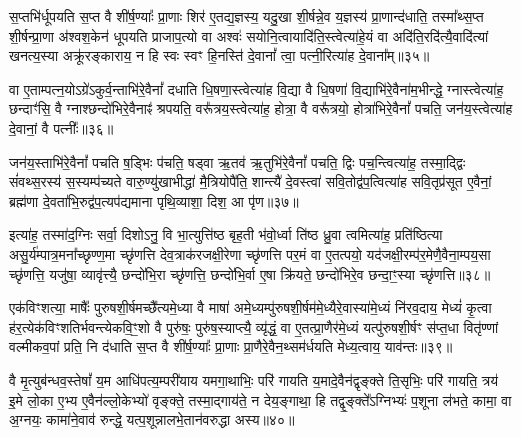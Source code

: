 {\anuvakamend[{तेनै॒व लोम॑भिः॒ समे॒ते अ॑भि॒चर॑त॒ एक॑विꣳशतिश्च॥६॥}]}

स॒प्तभि॑र्धूपयति स॒प्त वै शी॑र्\mbox{}ष॒ण्याः᳚ प्रा॒णाः शिर॑ ए॒तद्य॒ज्ञस्य॒ यदु॒खा शी॒र्\mbox{}षन्ने॒व य॒ज्ञस्य॑ प्रा॒णान्द॑धाति॒ तस्मा᳚थ्स॒प्त शी॒र्\mbox{}षन्प्रा॒णा अ॑श्वश॒केन॑ धूपयति प्राजाप॒त्यो वा अश्वः॑ सयोनि॒त्वायादि॑ति॒स्त्वेत्या॑हे॒यं वा अदि॑ति॒रदि॑त्यै॒वादि॑त्यां खनत्य॒स्या अक्रू॑रङ्काराय॒ न हि स्वः स्वꣳ हि॒नस्ति॑ दे॒वानां᳚ त्वा॒ पत्नी॒रित्या॑ह दे॒वाना᳚म्॥३५॥

वा ए॒ताम्पत्न॒यो\-ऽग्रे॑\-ऽकुर्व॒न्ताभि॑रे॒वैनां᳚ दधाति धि॒षणा॒स्त्वेत्या॑ह वि॒द्या वै धि॒षणा॑ वि॒द्याभि॑रे॒वैना॑म॒भीन्द्धे॒ ग्नास्त्वेत्या॑ह॒ छन्दाꣳ॑सि॒ वै ग्नाश्छन्दो॑भिरे॒वैनाꣴ॑ श्रपयति॒ वरू᳚त्रय॒स्त्वेत्या॑ह॒ होत्रा॒ वै वरू᳚त्रयो॒ होत्रा॑भिरे॒वैनां᳚ पचति॒ जन॑य॒स्त्वेत्या॑ह दे॒वानां॒ वै पत्नीः᳚॥३६॥

जन॑य॒स्ताभि॑रे॒वैनां᳚ पचति ष॒ड्भिः प॑चति॒ षड्वा ऋ॒तव॑ ऋ॒तुभि॑रे॒वैनां᳚ पचति॒ द्विः पच॒न्त्वित्या॑ह॒ तस्मा॒द्द्विः सं॑वथ्स॒रस्य॑ स॒स्यम्प॑च्यते वारु॒ण्यु॑खाभीद्धा॑ मै॒त्रियोपै॑ति॒ शान्त्यै॑ दे॒वस्त्वा॑ सवि॒तोद्व॑प॒त्वित्या॑ह सवि॒तृप्र॑सूत ए॒वैनां॒ ब्रह्म॑णा दे॒वता॑भि॒रुद्व॑प॒त्यप॑द्यमाना पृथि॒व्याशा॒ दिश॒ आ पृ॑ण॥३७॥

इत्या॑ह॒ तस्मा॑द॒ग्निः सर्वा॒ दिशो\-ऽनु॒ वि भा॒त्युत्ति॑ष्ठ बृह॒ती भ॑वो॒र्ध्वा ति॑ष्ठ ध्रु॒वा त्वमित्या॑ह॒ प्रति॑ष्ठित्या असु॒र्य॑म्पात्र॒\-मना᳚च्छृण्ण॒मा च्छृ॑णत्ति देव॒त्राक॑रजक्षी॒रेणा च्छृ॑णत्ति पर॒मं वा ए॒तत्पयो॒ यद॑जक्षी॒रम्प॑र॒मेणै॒वैना॒म्पय॒सा च्छृ॑णत्ति॒ यजु॑षा॒ व्यावृ॑त्त्यै॒ छन्दो॑भि॒रा च्छृ॑णत्ति॒ छन्दो॑भि॒र्वा ए॒षा क्रि॑यते॒ छन्दो॑भिरे॒व छन्दा॒ꣳ॒स्या च्छृ॑णत्ति॥३८॥

{\anuvakamend[{आ॒ह॒ दे॒वानां॒ वै पत्नीः᳚ पृणै॒षा षट्च॑॥७॥}]}

एक॑विꣳशत्या॒ माषैः᳚ पुरुषशी॒र्\mbox{}षमच्छै᳚त्यमे॒ध्या वै माषा॑ अमे॒ध्यम्पु॑रुषशी॒र्\mbox{}षम॑मे॒ध्यैरे॒वास्या॑मे॒ध्यं नि॑रव॒दाय॒ मेध्यं॑ कृ॒त्वा ह॑र॒त्येक॑विꣳशतिर्भवन्त्येकवि॒ꣳ॒शो वै पुरु॑षः॒ पुरु॑ष॒स्याप्त्यै॒ व्यृ॑द्धं॒ वा ए॒तत्प्रा॒णैर॑मे॒ध्यं यत्पु॑रुषशी॒र्\mbox{}षꣳ स॑प्त॒धा वितृ॑ण्णां वल्मीकव॒पां प्रति॒ नि द॑धाति स॒प्त वै शी॑र्\mbox{}ष॒ण्याः᳚ प्रा॒णाः प्रा॒णैरे॒वैन॒थ्सम॑र्धयति मेध्य॒त्वाय॒ याव॑न्तः॥३९॥

वै मृ॒त्युब॑न्धव॒स्तेषां᳚ य॒म आधि॑पत्य॒म्परी॑याय यमगा॒थाभिः॒ परि॑ गायति य॒मादे॒वैन॑द्वृङ्क्ते ति॒सृभिः॒ परि॑ गायति॒ त्रय॑ इ॒मे लो॒का ए॒भ्य ए॒वैन॑ल्लो॒केभ्यो॑ वृङ्क्ते॒ तस्मा॒द्गाय॑ते॒ न देय॒ङ्गाथा॒ हि तद्वृ॒ङ्क्ते᳚\-ऽग्निभ्यः॑ प॒शूना ल॑भते॒ कामा॒ वा अ॒ग्नयः॒ कामा॑ने॒वाव॑ रुन्द्धे॒ यत्प॒शून्नालभे॒तान॑वरुद्धा अस्य॥४०॥

